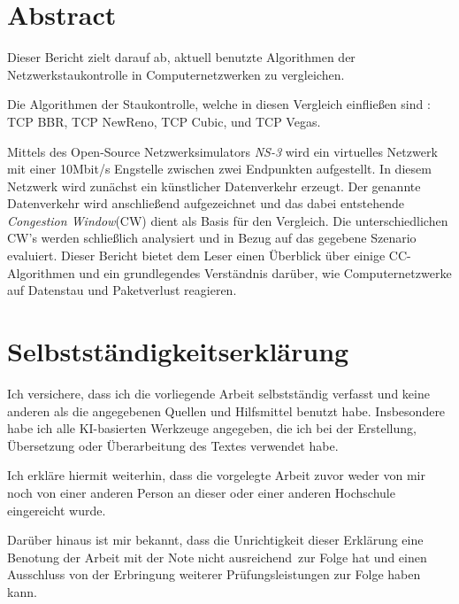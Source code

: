 \documentclass[paper=a4,fontsize=12pt,ngerman]{scrartcl}
\begin{document}
\pagestyle{plain}





\section*{Abstract}



Dieser Bericht zielt darauf ab, aktuell benutzte Algorithmen der Netzwerkstaukontrolle in Computernetzwerken 
zu vergleichen.

Die Algorithmen der Staukontrolle, welche in diesen Vergleich einfließen sind : TCP BBR,
TCP NewReno, TCP Cubic, und TCP Vegas.  \newline

Mittels des Open-Source Netzwerksimulators \textit{NS-3}\cite{ns3-simu} wird ein virtuelles Netzwerk mit einer 10Mbit/s Engstelle zwischen zwei Endpunkten aufgestellt. 
In diesem Netzwerk wird zunächst ein künstlicher Datenverkehr erzeugt.
Der genannte Datenverkehr wird anschließend aufgezeichnet und das dabei entstehende \textit{Congestion Window}(CW) dient als Basis für den Vergleich.
Die unterschiedlichen CW's werden schließlich analysiert und in Bezug auf das gegebene Szenario evaluiert.
Dieser Bericht bietet dem Leser einen Überblick über einige CC-Algorithmen und ein grundlegendes Verständnis darüber, wie Computernetzwerke auf Datenstau und 
Paketverlust reagieren.




\newpage
\section*{Selbstständigkeitserklärung}
Ich versichere, dass ich die vorliegende Arbeit selbstständig verfasst und 
keine anderen als die angegebenen Quellen und Hilfsmittel benutzt habe.
Insbesondere habe ich alle KI-basierten Werkzeuge angegeben, die ich bei
der Erstellung, Übersetzung oder Überarbeitung des Textes verwendet habe.

Ich erkläre hiermit weiterhin, dass die vorgelegte Arbeit zuvor weder von mir 
noch von einer anderen Person an dieser oder einer anderen Hochschule 
eingereicht wurde.

Darüber hinaus ist mir bekannt, dass die Unrichtigkeit dieser Erklärung eine 
Benotung der Arbeit mit der Note \glqq nicht ausreichend\grqq \ zur Folge hat 
und einen Ausschluss von der Erbringung weiterer Prüfungsleistungen zur Folge 
haben kann.
\bigskip
 
\end{document}

